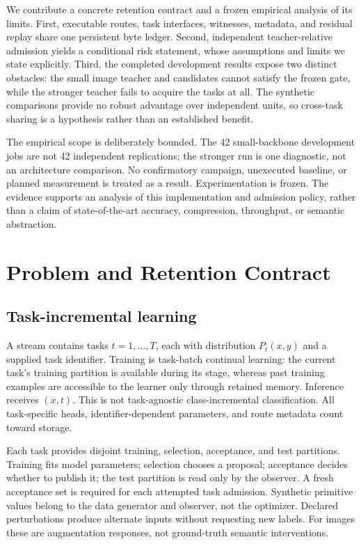 \documentclass{article}
\begin{document}
We contribute a concrete retention contract and a frozen empirical analysis of its limits. First, executable routes, task interfaces, witnesses, metadata, and residual replay share one persistent byte ledger. Second, independent teacher-relative admission yields a conditional risk statement, whose assumptions and limits we state explicitly. Third, the completed development results expose two distinct obstacles: the small image teacher and candidates cannot satisfy the frozen gate, while the stronger teacher fails to acquire the tasks at all. The synthetic comparisons provide no robust advantage over independent units, so cross-task sharing is a hypothesis rather than an established benefit.

The empirical scope is deliberately bounded. The 42 small-backbone development jobs are not 42 independent replications; the stronger run is one diagnostic, not an architecture comparison. No confirmatory campaign, unexecuted baseline, or planned measurement is treated as a result. Experimentation is frozen. The evidence supports an analysis of this implementation and admission policy, rather than a claim of state-of-the-art accuracy, compression, throughput, or semantic abstraction.

\section{Problem and Retention Contract}
\label{sec:problem}
\subsection{Task-incremental learning}
A stream contains tasks $t=1,\ldots,T$, each with distribution $P_t(x,y)$ and a supplied task identifier. Training is task-batch continual learning: the current task's training partition is available during its stage, whereas past training examples are accessible to the learner only through retained memory. Inference receives $(x,t)$. This is not task-agnostic class-incremental classification. All task-specific heads, identifier-dependent parameters, and route metadata count toward storage.

Each task provides disjoint training, selection, acceptance, and test partitions. Training fits model parameters; selection chooses a proposal; acceptance decides whether to publish it; the test partition is read only by the observer. A fresh acceptance set is required for each attempted task admission. Synthetic primitive values belong to the data generator and observer, not the optimizer. Declared perturbations produce alternate inputs without requesting new labels. For images these are augmentation responses, not ground-truth semantic interventions.
\end{document}
